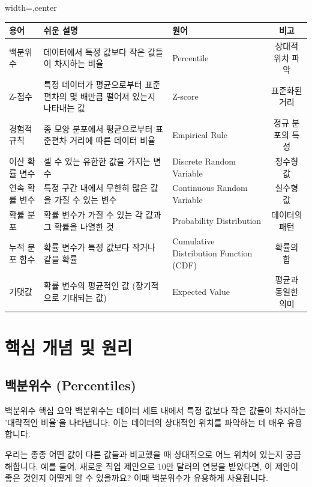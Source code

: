 \documentclass[11pt,a4paper]{article}
\begin{document}
\begin{adjustbox}{width=\textwidth,center}
\begin{tabular}{lllc}
\toprule
\textbf{용어} & \textbf{쉬운 설명} & \textbf{원어} & \textbf{비고} \\
\midrule
백분위수 & 데이터에서 특정 값보다 작은 값들이 차지하는 비율 & Percentile & 상대적 위치 파악 \\
Z-점수 & 특정 데이터가 평균으로부터 표준편차의 몇 배만큼 떨어져 있는지 나타내는 값 & Z-score & 표준화된 거리 \\
경험적 규칙 & 종 모양 분포에서 평균으로부터 표준편차 거리에 따른 데이터 비율 & Empirical Rule & 정규 분포의 특성 \\
이산 확률 변수 & 셀 수 있는 유한한 값을 가지는 변수 & Discrete Random Variable & 정수형 값 \\
연속 확률 변수 & 특정 구간 내에서 무한히 많은 값을 가질 수 있는 변수 & Continuous Random Variable & 실수형 값 \\
확률 분포 & 확률 변수가 가질 수 있는 각 값과 그 확률을 나열한 것 & Probability Distribution & 데이터의 패턴 \\
누적 분포 함수 & 확률 변수가 특정 값보다 작거나 같을 확률 & Cumulative Distribution Function (CDF) & 확률의 합 \\
기댓값 & 확률 변수의 평균적인 값 (장기적으로 기대되는 값) & Expected Value & 평균과 동일한 의미 \\
\bottomrule
\end{tabular}
\end{adjustbox}

\newpage
\section{핵심 개념 및 원리}

\subsection{백분위수 (Percentiles)}

\begin{summarybox}{백분위수 핵심 요약}
백분위수는 데이터 세트 내에서 특정 값보다 작은 값들이 차지하는 '대략적인 비율'을 나타냅니다. 이는 데이터의 상대적인 위치를 파악하는 데 매우 유용합니다.
\end{summarybox}

우리는 종종 어떤 값이 다른 값들과 비교했을 때 상대적으로 어느 위치에 있는지 궁금해합니다. 예를 들어, 새로운 직업 제안으로 10만 달러의 연봉을 받았다면, 이 제안이 좋은 것인지 어떻게 알 수 있을까요? 이때 백분위수가 유용하게 사용됩니다.
\end{document}
